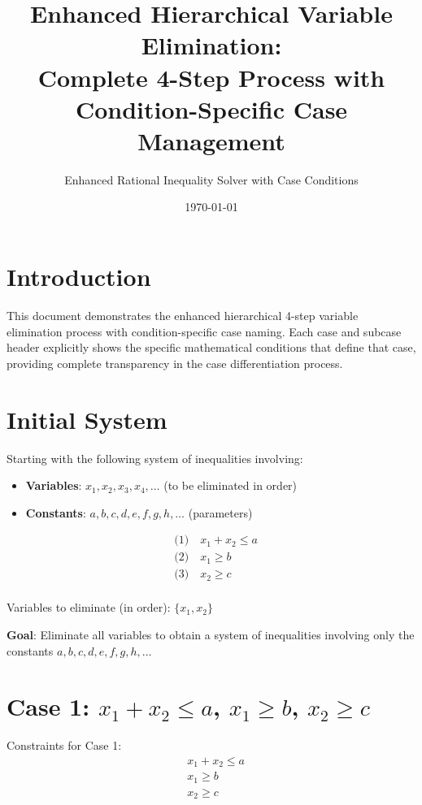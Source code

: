 \documentclass{article}
\title{Enhanced Hierarchical Variable Elimination: \\
Complete 4-Step Process with Condition-Specific Case Management}
\author{Enhanced Rational Inequality Solver with Case Conditions}
\date{\today}
\begin{document}
\maketitle

\section{Introduction}

This document demonstrates the enhanced hierarchical 4-step variable elimination process
with condition-specific case naming. Each case and subcase header explicitly shows the
specific mathematical conditions that define that case, providing complete transparency
in the case differentiation process.

\section{Initial System}

Starting with the following system of inequalities involving:
\begin{itemize}
\item \textbf{Variables}: $x_1, x_2, x_3, x_4, \ldots$ (to be eliminated in order)
\item \textbf{Constants}: $a, b, c, d, e, f, g, h, \ldots$ (parameters)
\end{itemize}

\begin{align}
& \text{(1)} \quad x_{1} + x_{2} \leq a \\
& \text{(2)} \quad x_{1} \geq b \\
& \text{(3)} \quad x_{2} \geq c \\
\end{align}

Variables to eliminate (in order): $\{x_{1}, x_{2}\}$

\textbf{Goal}: Eliminate all variables to obtain a system of inequalities
involving only the constants $a, b, c, d, e, f, g, h, \ldots$

\section{Case 1: $x_{1} + x_{2} \leq a$, $x_{1} \geq b$, $x_{2} \geq c$}

Constraints for Case 1:
\begin{align}
& x_{1} + x_{2} \leq a \\
& x_{1} \geq b \\
& x_{2} \geq c \\
\end{align}
\end{document}
